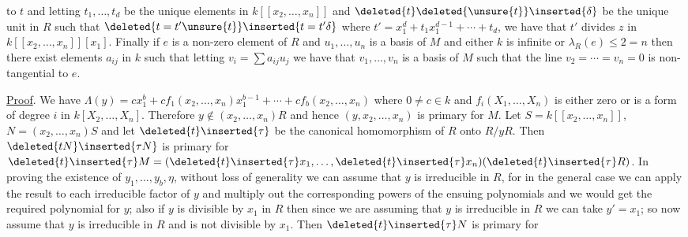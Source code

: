 to $t$ and letting $t_1,\ldots,t_d$ be the unique elements in $k[[x_2,\ldots,x_n]]$ and $\deleted{t}\deleted{\unsure{t}}\inserted{\delta}$  be the unique unit in $R$ such that $\deleted{t=t'\unsure{t}}\inserted{t=t'\delta}$ where $t'=x_1^d+t_1x_1^{d-1}+\cdots+t_d$, we have that $t'$ divides $z$ in $k[[x_2,\ldots,x_n]][x_1]$.
Finally if $e$ is a non-zero element of $R$ and $u_1,\ldots,u_n$ is a basis of $M$ and either $k$ is infinite or $\lambda_R(e)\leq2=n$ then there exist elements $a_{ij}$ in $k$ such that letting $v_i=\sum a_{ij}u_j$ we have that $v_1,\ldots,v_n$ is a basis of $M$ such that the line $v_2=\cdots=v_n=0$ is non-tangential to $e$.

\uline{Proof}. We have $\Lambda(y)=cx_1^b+cf_1(x_2,\ldots,x_n)x_1^{b-1}+\cdots+cf_b(x_2,\ldots,x_n)$ where $0\ne c\in k$ and $f_i(X_1,\ldots,X_n)$ is either zero or is a form of degree $i$ in $k[X_2,\ldots,X_n]$. Therefore $y\notin(x_2,\ldots,x_n)R$ and hence $(y,x_2,\ldots,x_n)$ is primary for $M$. Let $S=k[[x_2,\ldots,x_n]]$, $N=(x_2,\ldots,x_n)S$ and let $\deleted{t}\inserted{\tau}$ be the canonical homomorphism of $R$ onto $R/yR$. Then $\deleted{tN}\inserted{\tau N}$ is primary for $\deleted{t}\inserted{\tau}M=(\deleted{t}\inserted{\tau}x_1,\ldots,\deleted{t}\inserted{\tau}x_n)(\deleted{t}\inserted{\tau}R)$.
In proving the existence of $y_1,\ldots,y_b,\eta$, without loss of generality we can assume that $y$ is irreducible in $R$, for in the general case we can apply the result to each irreducible factor of $y$ and multiply out the corresponding powers of the ensuing polynomials and we would get the required polynomial for $y$; also if $y$ is divisible by $x_1$ in $R$ then since we are assuming that $y$ is irreducible in $R$ we can take $y'=x_1$; so now assume that $y$ is irreducible in $R$ and is not divisible by $x_1$. Then $\deleted{t}\inserted{\tau}N$ is primary for
